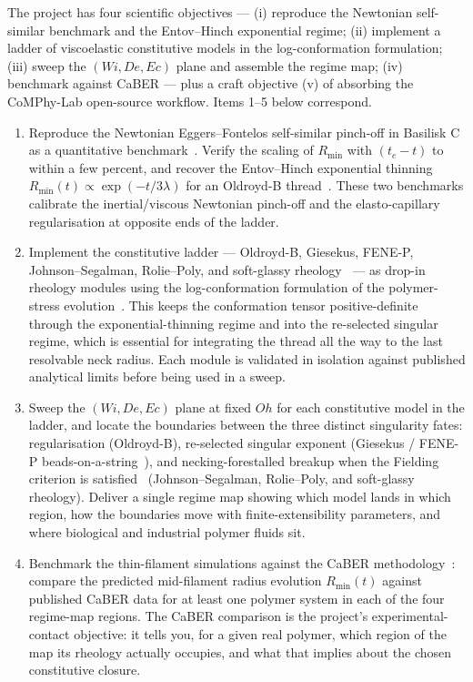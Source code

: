 \documentclass[11pt]{article}
\begin{document}
The project has four scientific objectives --- (i) reproduce the Newtonian self-similar benchmark and the Entov--Hinch exponential regime; (ii) implement a ladder of viscoelastic constitutive models in the log-conformation formulation; (iii) sweep the $(Wi, De, Ec)$ plane and assemble the regime map; (iv) benchmark against CaBER --- plus a craft objective (v) of absorbing the CoMPhy-Lab open-source workflow. Items 1--5 below correspond.

\begin{enumerate}
\itemsep0em
\item Reproduce the Newtonian Eggers--Fontelos self-similar pinch-off in Basilisk C as a quantitative benchmark~\citep{eggers1993universalPinchOff,eggers2015singularities,popinet2015quadtree,basiliskVatsal}. Verify the scaling of $R_{\min}$ with $(t_c - t)$ to within a few percent, and recover the Entov--Hinch exponential thinning $R_{\min}(t) \propto \exp(-t/3\lambda)$ for an Oldroyd-B thread~\citep{entovHinch1997}. These two benchmarks calibrate the inertial/viscous Newtonian pinch-off and the elasto-capillary regularisation at opposite ends of the ladder.
\item Implement the constitutive ladder --- Oldroyd-B, Giesekus, FENE-P, Johnson--Segalman, Rolie--Poly, and soft-glassy rheology~\citep{entovHinch1997,bhat2010beads,wilsonFielding2006,likhtmanGraham2003roliepoly,sollich1997sgr} --- as drop-in rheology modules using the log-conformation formulation of the polymer-stress evolution~\citep{fattalKupferman2004logconf}. This keeps the conformation tensor positive-definite through the exponential-thinning regime and into the re-selected singular regime, which is essential for integrating the thread all the way to the last resolvable neck radius. Each module is validated in isolation against published analytical limits before being used in a sweep.
\item Sweep the $(Wi, De, Ec)$ plane at fixed $Oh$ for each constitutive model in the ladder, and locate the boundaries between the three distinct singularity fates: regularisation (Oldroyd-B), re-selected singular exponent (Giesekus / FENE-P beads-on-a-string~\citep{bhat2010beads}), and necking-forestalled breakup when the Fielding criterion is satisfied~\citep{fielding2011necking,hoyleFielding2016necking} (Johnson--Segalman, Rolie--Poly, and soft-glassy rheology). Deliver a single regime map showing which model lands in which region, how the boundaries move with finite-extensibility parameters, and where biological and industrial polymer fluids sit.
\item Benchmark the thin-filament simulations against the CaBER methodology~\citep{mckinleyTripathi2000caber}: compare the predicted mid-filament radius evolution $R_{\min}(t)$ against published CaBER data for at least one polymer system in each of the four regime-map regions. The CaBER comparison is the project's experimental-contact objective: it tells you, for a given real polymer, which region of the map its rheology actually occupies, and what that implies about the chosen constitutive closure.

\end{enumerate}
\end{document}
